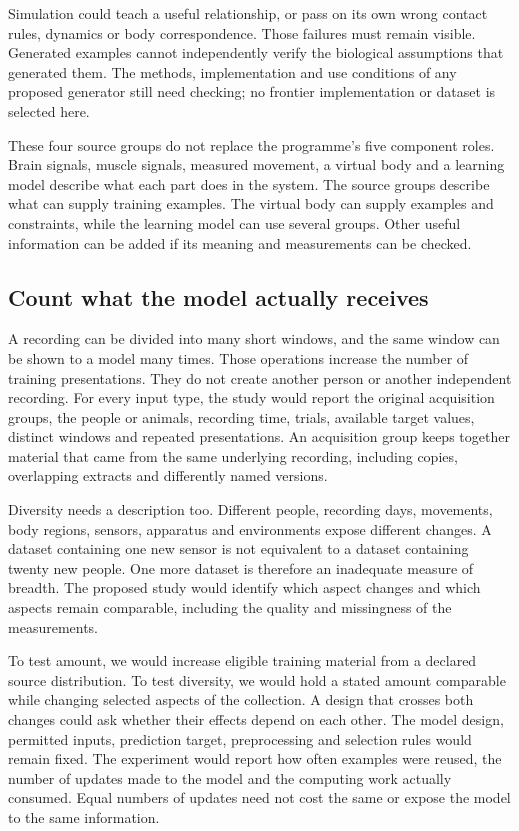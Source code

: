 Simulation could teach a useful relationship, or pass on its own wrong contact rules, dynamics or body correspondence. Those failures must remain visible. Generated examples cannot independently verify the biological assumptions that generated them. The methods, implementation and use conditions of any proposed generator still need checking; no frontier implementation or dataset is selected here.

These four source groups do not replace the programme's five component roles. Brain signals, muscle signals, measured movement, a virtual body and a learning model describe what each part does in the system. The source groups describe what can supply training examples. The virtual body can supply examples and constraints, while the learning model can use several groups. Other useful information can be added if its meaning and measurements can be checked.

\subsection{Count what the model actually receives}

A recording can be divided into many short windows, and the same window can be shown to a model many times. Those operations increase the number of training presentations. They do not create another person or another independent recording. For every input type, the study would report the original acquisition groups, the people or animals, recording time, trials, available target values, distinct windows and repeated presentations. An acquisition group keeps together material that came from the same underlying recording, including copies, overlapping extracts and differently named versions.

Diversity needs a description too. Different people, recording days, movements, body regions, sensors, apparatus and environments expose different changes. A dataset containing one new sensor is not equivalent to a dataset containing twenty new people. One more dataset is therefore an inadequate measure of breadth. The proposed study would identify which aspect changes and which aspects remain comparable, including the quality and missingness of the measurements.

To test amount, we would increase eligible training material from a declared source distribution. To test diversity, we would hold a stated amount comparable while changing selected aspects of the collection. A design that crosses both changes could ask whether their effects depend on each other. The model design, permitted inputs, prediction target, preprocessing and selection rules would remain fixed. The experiment would report how often examples were reused, the number of updates made to the model and the computing work actually consumed. Equal numbers of updates need not cost the same or expose the model to the same information.


